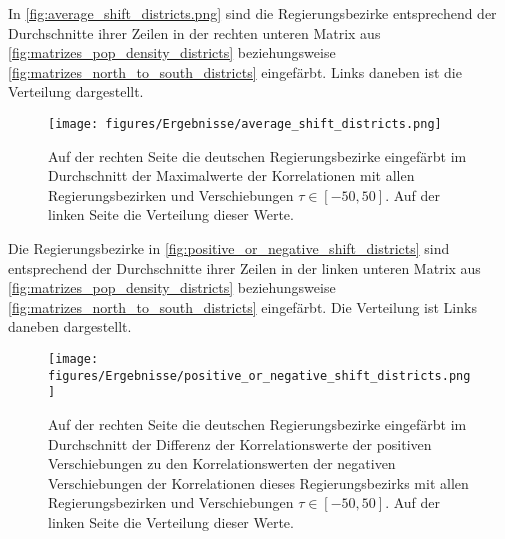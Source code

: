 In \autoref{fig:average_shift_districts.png} sind die Regierungsbezirke entsprechend der Durchschnitte ihrer Zeilen in der rechten unteren Matrix aus \autoref{fig:matrizes_pop_density_districts} beziehungsweise \autoref{fig:matrizes_north_to_south_districts} eingefärbt. Links daneben ist die Verteilung dargestellt.

\begin{figure}[H]
    \centering
    \texttt{[image: figures/Ergebnisse/average\_shift\_districts.png]}
    \caption{Auf der rechten Seite die deutschen Regierungsbezirke eingefärbt im Durchschnitt der Maximalwerte der Korrelationen mit allen Regierungsbezirken und Verschiebungen $\tau\in[-50,50]$. Auf der linken Seite die Verteilung dieser Werte.}
    \label{fig:average_shift_districts.png}
\end{figure}

Die Regierungsbezirke in \autoref{fig:positive_or_negative_shift_districts} sind  entsprechend der Durchschnitte ihrer Zeilen in der linken unteren Matrix aus \autoref{fig:matrizes_pop_density_districts} beziehungsweise \autoref{fig:matrizes_north_to_south_districts} eingefärbt. Die Verteilung ist Links daneben dargestellt.

\begin{figure}[H]
    \centering
    \texttt{[image: figures/Ergebnisse/positive\_or\_negative\_shift\_districts.png]}
    \caption{Auf der rechten Seite die deutschen Regierungsbezirke eingefärbt im Durchschnitt der Differenz der Korrelationswerte der positiven Verschiebungen zu den Korrelationswerten der negativen Verschiebungen der Korrelationen dieses Regierungsbezirks mit allen Regierungsbezirken und Verschiebungen $\tau\in[-50,50]$. Auf der linken Seite die Verteilung dieser Werte.}
    \label{fig:positive_or_negative_shift_districts}
\end{figure}

